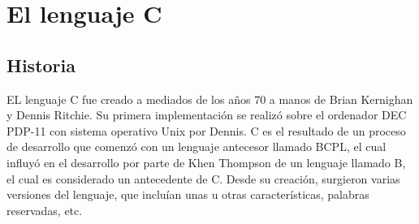 \documentclass[letterpaper, 12pt]{article}
\begin{document}
    \portada[Tarea 02]
    {\centering\section*{\LARGE El lenguaje C}\vspace{1cm}}
        \subsection*{Historia}
        EL lenguaje C fue creado a mediados de los años 70 a manos de Brian Kernighan y Dennis Ritchie.
        Su primera implementación se realizó sobre el ordenador DEC PDP-11 con sistema operativo
        Unix por Dennis. C es el resultado de un proceso de desarrollo que comenzó con un lenguaje antecesor
        llamado BCPL, el cual influyó en el desarrollo por parte de Khen Thompson de un lenguaje llamado B, el 
        cual es considerado un antecedente de C. Desde su creación, surgieron varias versiones del lenguaje, que 
        incluían unas u otras características, palabras reservadas, etc.
\end{document}
